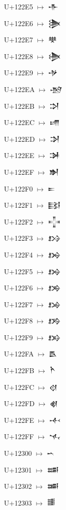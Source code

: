 {\noindent U+122E5  $\mapsto$ {\cufont 𒋥}\par
\noindent U+122E6  $\mapsto$ {\cufont 𒋦}\par
\noindent U+122E7  $\mapsto$ {\cufont 𒋧}\par
\noindent U+122E8  $\mapsto$ {\cufont 𒋨}\par
\noindent U+122E9  $\mapsto$ {\cufont 𒋩}\par
\noindent U+122EA  $\mapsto$ {\cufont 𒋪}\par
\noindent U+122EB  $\mapsto$ {\cufont 𒋫}\par
\noindent U+122EC  $\mapsto$ {\cufont 𒋬}\par
\noindent U+122ED  $\mapsto$ {\cufont 𒋭}\par
\noindent U+122EE  $\mapsto$ {\cufont 𒋮}\par
\noindent U+122EF  $\mapsto$ {\cufont 𒋯}\par
\noindent U+122F0  $\mapsto$ {\cufont 𒋰}\par
\noindent U+122F1  $\mapsto$ {\cufont 𒋱}\par
\noindent U+122F2  $\mapsto$ {\cufont 𒋲}\par
\noindent U+122F3  $\mapsto$ {\cufont 𒋳}\par
\noindent U+122F4  $\mapsto$ {\cufont 𒋴}\par
\noindent U+122F5  $\mapsto$ {\cufont 𒋵}\par
\noindent U+122F6  $\mapsto$ {\cufont 𒋶}\par
\noindent U+122F7  $\mapsto$ {\cufont 𒋷}\par
\noindent U+122F8  $\mapsto$ {\cufont 𒋸}\par
\noindent U+122F9  $\mapsto$ {\cufont 𒋹}\par
\noindent U+122FA  $\mapsto$ {\cufont 𒋺}\par
\noindent U+122FB  $\mapsto$ {\cufont 𒋻}\par
\noindent U+122FC  $\mapsto$ {\cufont 𒋼}\par
\noindent U+122FD  $\mapsto$ {\cufont 𒋽}\par
\noindent U+122FE  $\mapsto$ {\cufont 𒋾}\par
\noindent U+122FF  $\mapsto$ {\cufont 𒋿}\par
\noindent U+12300  $\mapsto$ {\cufont 𒌀}\par
\noindent U+12301  $\mapsto$ {\cufont 𒌁}\par
\noindent U+12302  $\mapsto$ {\cufont 𒌂}\par
\noindent U+12303  $\mapsto$ {\cufont 𒌃}\par
}
